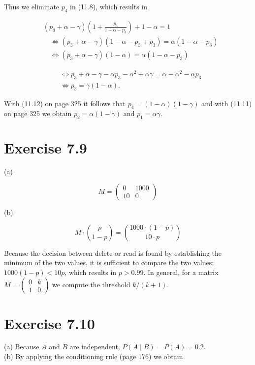 \documentclass[10pt]{article}
\begin{document}
Thus we eliminate $p_{4}$ in (11.8), which results in


\begin{align*}
& \left(p_{3}+\alpha-\gamma\right)\left(1+\frac{p_{3}}{1-\alpha-p_{3}}\right)+1-\alpha=1  \tag{11.13}\\
& \quad \Leftrightarrow\left(p_{3}+\alpha-\gamma\right)\left(1-\alpha-p_{3}+p_{3}\right)=\alpha\left(1-\alpha-p_{3}\right)  \tag{11.14}\\
& \quad \Leftrightarrow\left(p_{3}+\alpha-\gamma\right)(1-\alpha)=\alpha\left(1-\alpha-p_{3}\right) \tag{11.15}
\end{align*}



\begin{align*}
& \Leftrightarrow p_{3}+\alpha-\gamma-\alpha p_{3}-\alpha^{2}+\alpha \gamma=\alpha-\alpha^{2}-\alpha p_{3}  \tag{11.16}\\
& \Leftrightarrow p_{3}=\gamma(1-\alpha) . \tag{11.17}
\end{align*}


With (11.12) on page 325 it follows that $p_{4}=(1-\alpha)(1-\gamma)$ and with (11.11) on page 325 we obtain $p_{2}=\alpha(1-\gamma)$ and $p_{1}=\alpha \gamma$.

\section*{Exercise 7.9}
(a)

$$
M=\left(\begin{array}{cc}
0 & 1000 \\
10 & 0
\end{array}\right)
$$

(b)

$$
M \cdot\binom{p}{1-p}=\binom{1000 \cdot(1-p)}{10 \cdot p}
$$

Because the decision between delete or read is found by establishing the minimum of the two values, it is sufficient to compare the two values: $1000(1-p)<10 p$, which results in $p>0.99$. In general, for a matrix $M=\left(\begin{array}{ll}0 & k \\ 1 & 0\end{array}\right)$ we compute the threshold $k /(k+1)$.

\section*{Exercise 7.10}
(a) Because $A$ and $B$ are independent, $P(A \mid B)=P(A)=0.2$.\\
(b) By applying the conditioning rule (page 176) we obtain
\end{document}
